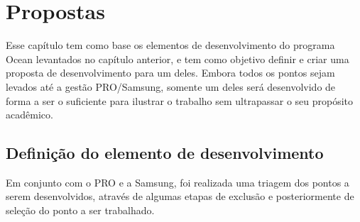\chapter{Propostas}
\label{cha:propostas}

Esse capítulo tem como base os elementos de desenvolvimento do programa Ocean levantados no capítulo anterior, e tem como objetivo definir e criar uma proposta de desenvolvimento para um deles. Embora todos os pontos sejam levados até a gestão PRO/Samsung, somente um deles será desenvolvido de forma a ser o suficiente para ilustrar o trabalho sem ultrapassar o seu propósito acadêmico.

\section{Definição do elemento de desenvolvimento}

Em conjunto com o PRO e a Samsung, foi realizada uma triagem dos pontos a serem desenvolvidos, através de algumas etapas de exclusão e posteriormente de seleção do ponto a ser trabalhado.

